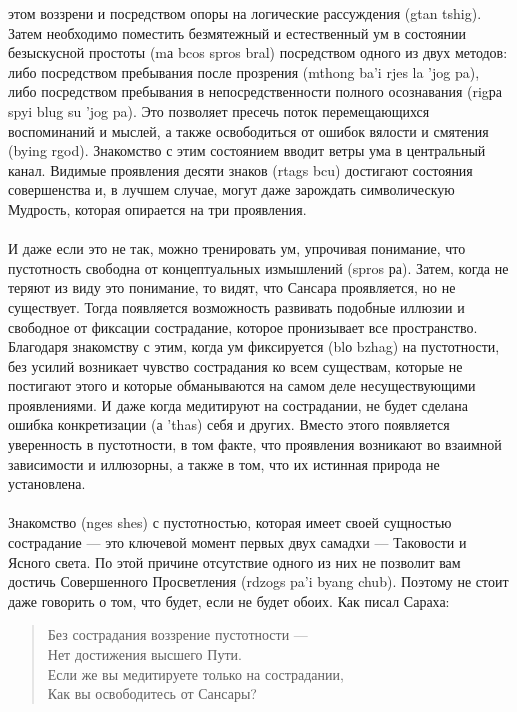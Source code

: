 \begin{siderules}
этом воззрени и посредством опоры на логические рассуждения (gtan tshig). Затем
необходимо поместить безмятежный и естественный ум в состоянии безыскусной простоты
(mа bcos spros bral) посредством одного из двух методов: либо посредством пребывания
после прозрения (mthong ba'i rjes la 'jog pa), либо посредством пребывания в
непосредственности полного осознавания (rigра spyi blug su 'jog pa). Это позволяет пресечь
поток перемещающихся воспоминаний и мыслей, а также освободиться от ошибок вялости и
смятения (bying rgod). Знакомство с этим состоянием вводит ветры ума в центральный канал.
Видимые проявления десяти знаков (rtags bcu) достигают состояния совершенства и, в
лучшем случае, могут даже зарождать символическую Мудрость, которая опирается на три
проявления.\\
\\
И даже если это не так, можно тренировать ум, упрочивая понимание, что пустотность
свободна от концептуальных измышлений (spros ра). Затем, когда не теряют из виду это
понимание, то видят, что Сансара проявляется, но не существует. Тогда появляется
возможность развивать подобные иллюзии и свободное от фиксации сострадание, которое
пронизывает все пространство. Благодаря знаком\-ству с этим, когда ум фиксируется (blо
bzhag) на пустотности, без усилий возникает чувство сострадания ко всем суще\-ствам,
которые не постигают этого и которые обманываются на самом деле несуществующими
проявлениями. И даже когда медитируют на сострадании, не будет сделана ошибка
конкретизации (а 'thas) себя и других. Вместо этого появляется уверенность в пустотности, в
том факте, что проявления возникают во взаимной зависимости и иллюзорны, а также в том,
что их истинная природа не установлена.\\
\\
Знакомство (nges shes) с пустотностью, которая имеет своей сущностью сострадание — это
ключевой момент первых двух самадхи — Таковости и Ясного света. По этой причине
отсутствие одного из них не позволит вам достичь Совершенного Просветления (rdzogs pa'i
byang chub). Поэтому не стоит даже говорить о том, что будет, если не будет обоих. Как
писал Сараха:
\begin{verse}
Без сострадания воззрение пустотности —\\
Нет достижения высшего Пути.\\
Если же вы медитируете только на сострадании,\\
Как вы освободитесь от Сансары?\\
\end{verse}

\end{siderules}
